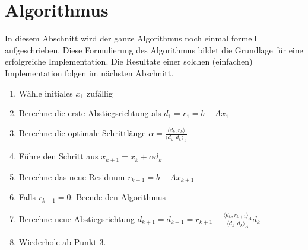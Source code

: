 \section{Algorithmus\label{cg:section:voraussetzungen}}

In diesem Abschnitt wird der ganze Algorithmus noch einmal formell aufgeschrieben.
Diese Formulierung des Algorithmus bildet die Grundlage für eine erfolgreiche Implementation.
Die Resultate einer solchen (einfachen) Implementation folgen im nächsten Abschnitt.

\begin{enumerate}
	\item Wähle initiales $x_1$ zufällig
	\item Berechne die erste Abstiegsrichtung als $d_1 = r_1 =  b-Ax_1$
	\item Berechne die optimale Schrittlänge  $ \alpha	= 	\displaystyle \frac{\langle d_k , r_k \rangle}{\langle d_k , d_k \rangle_A}$ 
	\item Führe den Schritt aus $x_{k+1} = x_k + \alpha d_k$
	\item Berechne das neue Residuum $r_{k+1} = b-Ax_{k+1}$
	\item Falls $r_{k+1} = 0$: Beende den Algorithmus
	\item Berechne neue Abstiegsrichtung $d_{k+1} = d_{k+1}	= 	r_{k+1} - \displaystyle \frac{\langle d_k , r_{k+1} \rangle_A}{\langle d_k , d_k \rangle_A} d_k $
	\item Wiederhole ab Punkt 3.
\end{enumerate}